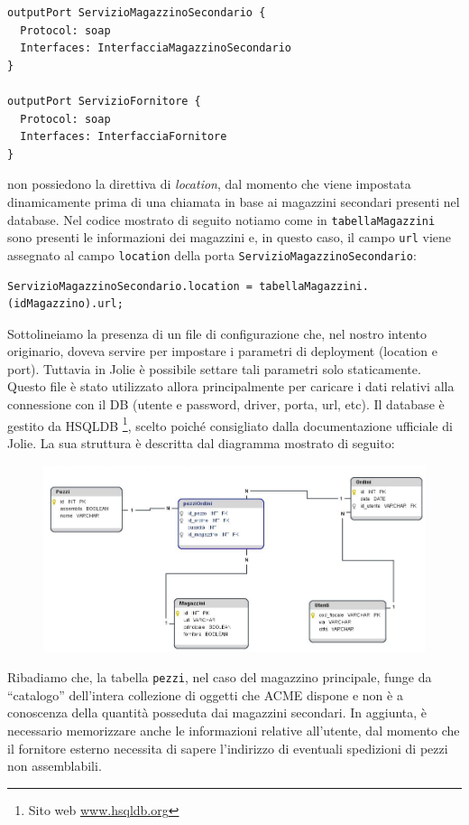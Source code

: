 \documentclass[twoside]{article}
\begin{document}
\begin{lstlisting}
outputPort ServizioMagazzinoSecondario {
  Protocol: soap
  Interfaces: InterfacciaMagazzinoSecondario
}

outputPort ServizioFornitore {
  Protocol: soap
  Interfaces: InterfacciaFornitore
}
\end{lstlisting}

non possiedono la direttiva di \textit{location}, dal momento che viene impostata dinamicamente
prima di una chiamata in base ai magazzini secondari presenti nel database. Nel codice
mostrato di seguito notiamo come in \texttt{tabellaMagazzini} sono presenti le informazioni
dei magazzini e, in questo caso, il campo \texttt{url} viene assegnato al campo
\texttt{location} della porta \texttt{ServizioMagazzinoSecondario}:
\begin{lstlisting}
ServizioMagazzinoSecondario.location = tabellaMagazzini.(idMagazzino).url;
\end{lstlisting}
Sottolineiamo la presenza di un file di configurazione che, nel nostro intento originario,
doveva servire per impostare i parametri di deployment (location e port). Tuttavia in Jolie
è possibile settare tali parametri solo staticamente. Questo file è stato utilizzato allora
principalmente per caricare i dati relativi alla connessione con il DB (utente e password, driver,
porta, url, etc). Il database è gestito da HSQLDB \footnote{Sito web \url{www.hsqldb.org}},
scelto poiché consigliato dalla documentazione ufficiale di Jolie. La sua struttura è descritta
dal diagramma mostrato di seguito:

\begin{figure}[!htbp]
\centering
\includegraphics[width=13cm]{modello_logico_mag_principale.png}
\label{fig:3}
\end{figure}
\newpage
Ribadiamo che, la tabella \texttt{pezzi}, nel caso del magazzino principale, funge da ``catalogo''
dell'intera collezione di oggetti che ACME dispone e non è a conoscenza della quantità posseduta
dai magazzini secondari. In aggiunta, è necessario memorizzare anche le informazioni relative
all'utente, dal momento che il fornitore esterno necessita di sapere l'indirizzo di eventuali spedizioni
di pezzi non assemblabili.
\end{document}
